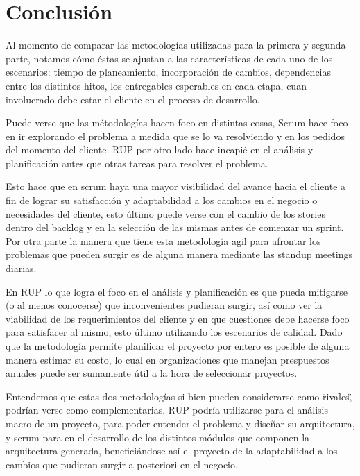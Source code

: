 \section*{Conclusi\'on}

Al momento de comparar las metodolog\'ias utilizadas para la primera y segunda parte, notamos c\'omo \'estas se ajustan a las caracter\'isticas de cada uno de los escenarios: tiempo de planeamiento, incorporaci\'on de cambios, dependencias entre los distintos hitos, los entregables esperables en cada etapa, cuan involucrado debe estar el cliente en el proceso de desarrollo. 

Puede verse que las m\'etodolog\'ias hacen foco en distintas cosas, Scrum hace foco en ir explorando el problema a medida que se lo va resolviendo y en los pedidos del momento del cliente. RUP por otro lado hace incapi\'e en el an\'alisis y planificaci\'on antes que otras tareas para resolver el problema.

Esto hace que en scrum haya una mayor visibilidad del avance hacia el cliente a fin de lograr su satisfacci\'on y adaptabilidad a los cambios en el negocio o necesidades del cliente, esto \'ultimo puede verse con el cambio de los stories dentro del backlog y en la selecci\'on de las mismas antes de comenzar un sprint. Por otra parte la manera que tiene esta metodolog\'ia agil para afrontar los problemas que pueden surgir es de alguna manera mediante las standup meetings diarias. 

En RUP lo que logra el foco en el an\'alisis y planificaci\'on es que pueda mitigarse (o al menos conocerse) que inconvenientes pudieran surgir, as\'i como ver la viabilidad de los requerimientos del cliente y en que cuestiones debe hacerse foco para satisfacer al mismo, esto \'ultimo utilizando los escenarios de calidad. Dado que la metodolog\'ia permite planificar el proyecto por entero es posible de alguna manera estimar su costo, lo cual en organizaciones que manejan prespuestos anuales puede ser sumamente \'util a la hora de seleccionar proyectos.

Entendemos que estas dos metodolog\'ias si bien pueden considerarse como \"rivales\", podr\'ian verse como complementarias. RUP podr\'ia utilizarse para el an\'alisis macro de un proyecto, para poder entender el problema y diseñar su arquitectura, y scrum para en el desarrollo de los distintos módulos que componen la arquitectura generada, benefici\'andose as\'i el proyecto de la adaptabilidad a los cambios que pudieran surgir a posteriori en el negocio.

